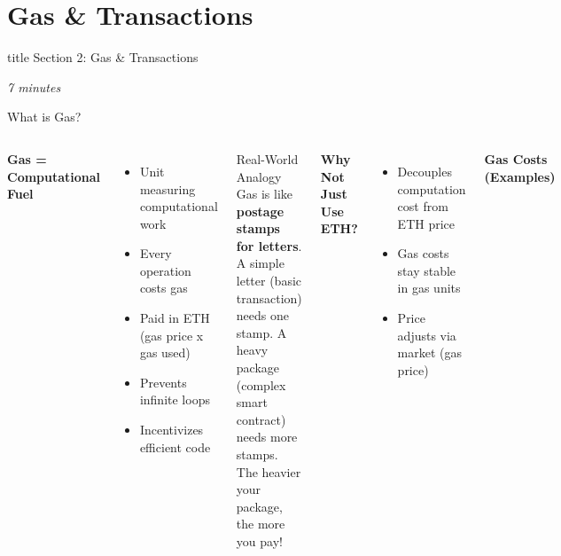 \documentclass[8pt,aspectratio=169]{beamer}
\begin{document}
\section{Gas \& Transactions}

\begin{frame}[t]
\vfill
\centering
\begin{beamercolorbox}[sep=8pt,center]{title}
\Large Section 2: Gas \& Transactions\par
\end{beamercolorbox}
\vfill
\small \textit{7 minutes}
\end{frame}

\begin{frame}[t]{What is Gas?}
\begin{columns}[T]
\textbf{Gas = Computational Fuel}

\begin{itemize}
\item Unit measuring computational work
\item Every operation costs gas
\item Paid in ETH (gas price x gas used)
\item Prevents infinite loops
\item Incentivizes efficient code
\end{itemize}

\vspace{0.3em}
\begin{block}{Real-World Analogy}
Gas is like \textbf{postage stamps for letters}. A simple letter (basic transaction) needs one stamp. A heavy package (complex smart contract) needs more stamps. The heavier your package, the more you pay!
\end{block}

\vspace{0.3em}
\textbf{Why Not Just Use ETH?}
\begin{itemize}
\item Decouples computation cost from ETH price
\item Gas costs stay stable in gas units
\item Price adjusts via market (gas price)
\end{itemize}

\textbf{Gas Costs (Examples)}


\end{columns}
\end{frame}
\end{document}
